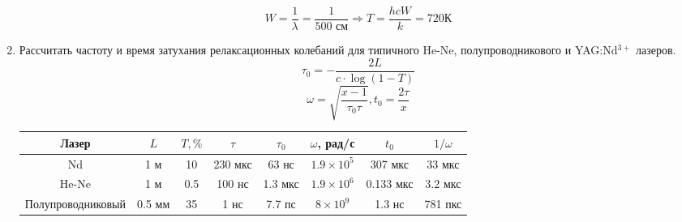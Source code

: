 \documentclass[a4paper, 12pt]{article}
\begin{document}
\begin{enumerate}
				\begin{equation*}
					W=\frac{1}{\lambda}=\frac{1}{500\text{ см}}\Rightarrow T=\frac{hcW}{k}=720\text{К}
				\end{equation*}
			\item Рассчитать частоту и время затухания релаксационных колебаний для типичного He-Ne, полупроводникового и YAG:Nd$^{3+}$ лазеров.
			\begin{equation*}
				\tau_0=-\frac{2L}{c\cdot\log\left(1-T\right)}
			\end{equation*}
			\begin{equation*}
				\omega=\sqrt{\frac{x-1}{\tau_0\tau}}, t_0=\frac{2\tau}{x}
			\end{equation*}
			\begin{table}[h]
				\centering
				\begin{tabular}{|c|c|c|c|c|c|c|c|}
					\hline
					Лазер & $L$ & $T,\%$ & $\tau$ & $\tau_0$ & $\omega$, рад/с & $t_0$ & $1/\omega$\\
					\hline
					Nd & 1 м & 10 & 230 мкс & 63 нс & $1.9\times 10^5$ & 307 мкс & 33 мкс\\
					He-Ne & 1 м & 0.5 & 100 нс & 1.3 мкс & $1.9\times 10^{6}$ & 0.133 мкс & 3.2 мкс\\
					Полупроводниковый & 0.5 мм & 35 & 1 нс & 7.7 пс & $8\times 10^9$ & 1.3 нс & 781 пкс\\
					\hline
				\end{tabular}
			\end{table}
	\end{enumerate}
\end{document}
